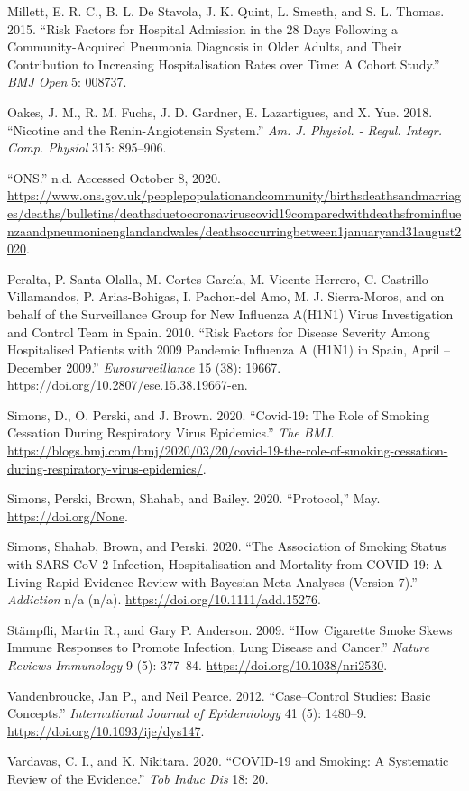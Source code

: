 \documentclass[
]{article}
\begin{document}
\leavevmode\hypertarget{ref-Millett_2015}{}%
Millett, E. R. C., B. L. De Stavola, J. K. Quint, L. Smeeth, and S. L.
Thomas. 2015. ``Risk Factors for Hospital Admission in the 28 Days
Following a Community-Acquired Pneumonia Diagnosis in Older Adults, and
Their Contribution to Increasing Hospitalisation Rates over Time: A
Cohort Study.'' \emph{BMJ Open} 5: 008737.

\leavevmode\hypertarget{ref-Oakes_2018}{}%
Oakes, J. M., R. M. Fuchs, J. D. Gardner, E. Lazartigues, and X. Yue.
2018. ``Nicotine and the Renin-Angiotensin System.'' \emph{Am. J.
Physiol. - Regul. Integr. Comp. Physiol} 315: 895--906.

\leavevmode\hypertarget{ref-ONS_2020}{}%
``ONS.'' n.d. Accessed October 8, 2020.
\url{https://www.ons.gov.uk/peoplepopulationandcommunity/birthsdeathsandmarriages/deaths/bulletins/deathsduetocoronaviruscovid19comparedwithdeathsfrominfluenzaandpneumoniaenglandandwales/deathsoccurringbetween1januaryand31august2020}.

\leavevmode\hypertarget{ref-Peralta_2010}{}%
Peralta, P. Santa-Olalla, M. Cortes-García, M. Vicente-Herrero, C.
Castrillo-Villamandos, P. Arias-Bohigas, I. Pachon-del Amo, M. J.
Sierra-Moros, and on behalf of the Surveillance Group for New Influenza
A(H1N1) Virus Investigation and Control Team in Spain. 2010. ``Risk
Factors for Disease Severity Among Hospitalised Patients with 2009
Pandemic Influenza A (H1N1) in Spain, April -- December 2009.''
\emph{Eurosurveillance} 15 (38): 19667.
\url{https://doi.org/10.2807/ese.15.38.19667-en}.

\leavevmode\hypertarget{ref-Simons_b_2020}{}%
Simons, D., O. Perski, and J. Brown. 2020. ``Covid-19: The Role of
Smoking Cessation During Respiratory Virus Epidemics.'' \emph{The BMJ}.
\url{https://blogs.bmj.com/bmj/2020/03/20/covid-19-the-role-of-smoking-cessation-during-respiratory-virus-epidemics/}.

\leavevmode\hypertarget{ref-Simons_c_2020}{}%
Simons, Perski, Brown, Shahab, and Bailey. 2020. ``Protocol,'' May.
\url{https://doi.org/None}.

\leavevmode\hypertarget{ref-Simons_a_2020}{}%
Simons, Shahab, Brown, and Perski. 2020. ``The Association of Smoking
Status with SARS-CoV-2 Infection, Hospitalisation and Mortality from
COVID-19: A Living Rapid Evidence Review with Bayesian Meta-Analyses
(Version 7).'' \emph{Addiction} n/a (n/a).
\url{https://doi.org/10.1111/add.15276}.

\leavevmode\hypertarget{ref-Stampfli_2009}{}%
Stämpfli, Martin R., and Gary P. Anderson. 2009. ``How Cigarette Smoke
Skews Immune Responses to Promote Infection, Lung Disease and Cancer.''
\emph{Nature Reviews Immunology} 9 (5): 377--84.
\url{https://doi.org/10.1038/nri2530}.

\leavevmode\hypertarget{ref-Vandenbroucke_2012}{}%
Vandenbroucke, Jan P., and Neil Pearce. 2012. ``Case--Control Studies:
Basic Concepts.'' \emph{International Journal of Epidemiology} 41 (5):
1480--9. \url{https://doi.org/10.1093/ije/dys147}.

\leavevmode\hypertarget{ref-Vardavas_2020}{}%
Vardavas, C. I., and K. Nikitara. 2020. ``COVID-19 and Smoking: A
Systematic Review of the Evidence.'' \emph{Tob Induc Dis} 18: 20.
\end{document}
